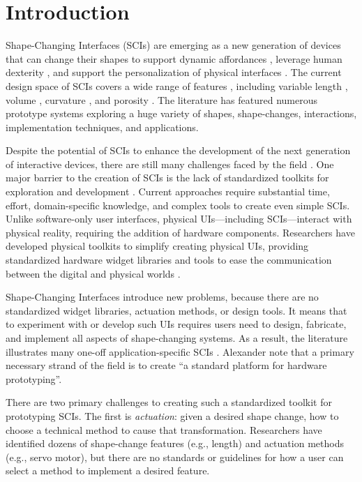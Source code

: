   \section{Introduction}
    Shape-Changing Interfaces (SCIs) are emerging as a new generation of
    devices that can change their shapes to support dynamic affordances
    \cite{Follmer:2013}, leverage human dexterity \cite{6926382},
    and support the personalization of physical interfaces
    \cite{Kim:2008}. The current design space of SCIs covers a
    wide range of features \cite{10.1145/3173574.3174193}, including variable
    length \cite{Follmer:2013}, volume
    \cite{Kim:2008}, curvature \cite{Yao:2013}, and porosity
    \cite{Coelho:2009}. The literature has featured numerous prototype systems
    exploring a huge variety of shapes, shape-changes, interactions,
    implementation techniques, and applications. 
    
    Despite the potential of SCIs to enhance the development of the
    next generation of interactive devices, there are still many challenges
    faced by the field \cite{Alexander:2018}. One major barrier to the creation
    of SCIs is the lack of standardized toolkits for exploration and development
    \cite{Alexander:2018}. Current approaches require substantial time,
    effort, domain-specific knowledge, and complex tools to create even simple
    SCIs. Unlike software-only user interfaces, physical UIs---including
    SCIs---interact with physical reality, requiring the addition of hardware
    components.  Researchers have developed physical toolkits to simplify
    creating physical UIs, providing standardized hardware widget libraries
    \cite{Greenberg:2001,Bdeir:2009kz} and tools to ease the communication
    between the digital and physical worlds \cite{Hartmann:2007}.
    
    Shape-Changing Interfaces introduce new problems, because there are no
    standardized widget libraries, actuation methods, or design tools. It
    means that to experiment with or develop such UIs requires users need to
    design, fabricate, and implement all aspects of shape-changing systems. As
    a result, the literature illustrates many one-off application-specific
    SCIs \cite{Sturdee:2018ce}. Alexander \etal note that a primary necessary
    strand of the field is to create ``a standard platform for hardware
    prototyping''.
    
    There are two primary challenges to creating such a standardized toolkit
    for prototyping SCIs. The first is \textit{actuation}: given a
    desired shape change, how to choose a technical method to cause that
    transformation. Researchers have identified dozens of shape-change
    features \cite{10.1145/3173574.3174193} (e.g., length) and actuation
    methods \cite{Sturdee:2018ce} (e.g., servo motor), but there are no
    standards or guidelines for how a user can select a method to implement a
    desired feature.
    
